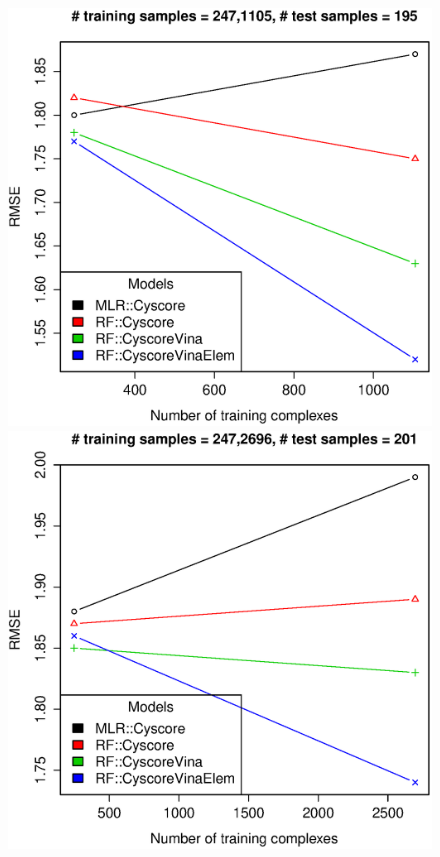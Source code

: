 \documentclass[journal=jacsat,manuscript=article]{achemso}
\begin{document}
\begin{figure}[ht!]
\includegraphics[width=\linewidth]{../rfcyscore/tst-195-rmse.eps}
\endminipage
{}
\includegraphics[width=\linewidth]{../rfcyscore/tst-201-rmse.eps}

\end{figure}
\end{document}

